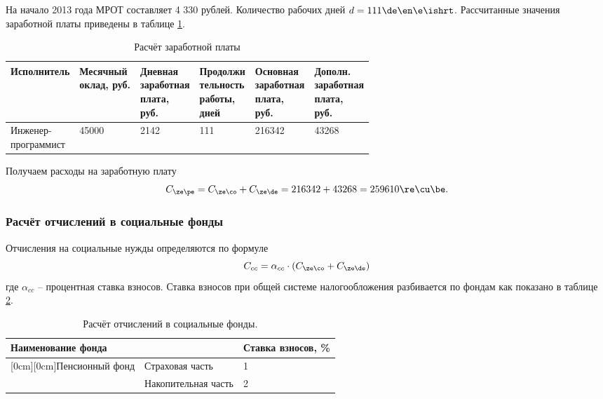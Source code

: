 На начало 2013 года МРОТ составляет 4 330 рублей. Количество рабочих дней $d = 111 \de\en\e\ishrt$. Рассчитанные значения заработной платы приведены в таблице \ref{tab:salary}.

\begin{table}[H]
    \caption{\label{tab:salary}Расчёт заработной платы}
    \begin{tabular}[H]{|l|l|l|l|l|l|}
        \hline
        Исполнитель & \specialcell{Месячный\\оклад, руб.} & \specialcell{Дневная\\заработная\\плата,\\руб.} & \specialcell{Продолжи\\тельность\\работы,\\дней} & \specialcell{Основная\\заработная\\плата,\\руб.} & \specialcell{Дополн.\\заработная\\плата,\\руб.} \\
        \hline
        \specialcell{Инженер-\\программист} & 45000 & 2142 & 111 & 216342 & 43268\\
        \hline
    \end{tabular}
\end{table}

Получаем расходы на заработную плату
\begin{equation*}
    C_{\ze\pe} = C_{\ze\co} + C_{\ze\de} = 216342 + 43268 = 259610 \re\cu\be.
\end{equation*}

\subsubsection{Расчёт отчислений в социальные фонды}
Отчисления на социальные нужды определяются по формуле
\begin{equation*}
    C_{cc} = \alpha_{cc} \cdot (C_{\ze\co} + C_{\ze\de})
\end{equation*}
где $\alpha_{cc}$ -- процентная ставка взносов. Ставка взносов при общей системе налогообложения разбивается по фондам как показано в таблице \ref{tab:social}.

\begin{table}[H]
    \caption{\label{tab:social} Расчёт отчислений в социальные фонды.}
    \begin{center}
        \begin{tabular}{|l|l|l|}
            \hline
            \multicolumn{2}{|l|}{Наименование фонда} & Ставка взносов, \% \\
            \hline
            \raisebox{-1ex}[0cm][0cm]{Пенсионный фонд} & Страховая часть & 1\\
             & Накопительная часть & 2 \\
            \hline
        \end{tabular}
    \end{center}
\end{table}